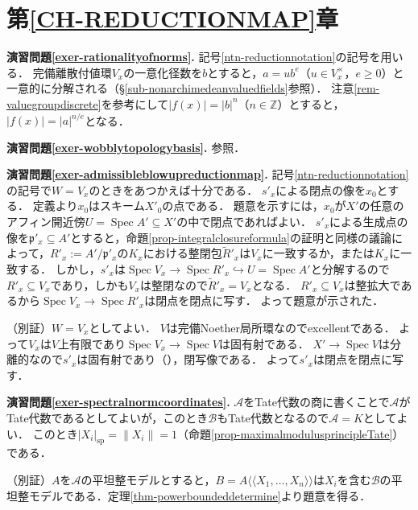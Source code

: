\documentclass[a4paper,12pt, dvipdfmx]{jsbook}
\def\Z{\mathbb{Z}}
\def\til#1{\widetilde{#1}}%
\def\sp{\mathop{\mathrm{sp}}\nolimits}
\def\Spec{\mathop{\mathrm{Spec}}\nolimits}
\def\dl{\langle\!\langle}
\def\dr{\rangle\!\rangle}
\newcommand{\abs}[1]{\lvert#1\rvert}
\newcommand{\abss}[1]{\|#1\|}
\theoremstyle{plain}
\theoremstyle{definition}
\begin{document}
{\section*{第\ref{CH-REDUCTIONMAP}章}

\noindent
{\bf 演習問題\ref{exer-rationalityofnorms}.}
記号\ref{ntn-reductionnotation}の記号を用いる．
完備離散付値環$V_x$の一意化径数を$b$とすると，$a=ub^e$（$u\in V^{\times}_x$，$e\geq 0$）と一意的に分解される（\S\ref{sub-nonarchimedeanvaluedfields}参照）．
注意\ref{rem-valuegroupdiscrete}を参考にして$\abs{f(x)}=\abs{b}^n$（$n\in\Z$）とすると，$\abs{f(x)}=\abs{a}^{n/e}$となる．

\medskip\noindent
{\bf 演習問題\ref{exer-wobblytopologybasis}.}
\cite[\S7.2.1]{BGR}参照．

\medskip\noindent
{\bf 演習問題\ref{exer-admissibleblowupreductionmap}.}
記号\ref{ntn-reductionnotation}の記号で$W=V_x$のときをあつかえば十分である．
$s'_x$による閉点の像を$x_0$とする．
定義より$x_0$はスキーム$X'_0$の点である．
題意を示すには，$x_0$が$X'$の任意のアフィン開近傍$U=\Spec A'\subseteq X'$の中で閉点であればよい．
$s'_x$による生成点の像を$\mathfrak{p}'_x\subseteq A'$とすると，命題\ref{prop-integralclosureformula}の証明と同様の議論によって，$R'_x:=A'/\mathfrak{p}'_x$の$K_x$における整閉包$\til{R}'_x$は$V_x$に一致するか，または$K_x$に一致する．
しかし，$s'_x$は$\Spec V_x\rightarrow\Spec R'_x\hookrightarrow U=\Spec A'$と分解するので$R'_x\subseteq V_x$であり，しかも$V_x$は整閉なので$\til{R}'_x=V_x$となる．
$R'_x\subseteq V_x$は整拡大であるから$\Spec V_x\rightarrow\Spec R'_x$は閉点を閉点に写す．
よって題意が示された．

\medskip\noindent
（別証）$W=V_x$としてよい．
$V$は完備Noether局所環なのでexcellentである．
よって$V_x$は$V$上有限であり$\Spec V_x\rightarrow\Spec V$は固有射である．
$X'\rightarrow\Spec V$は分離的なので$s'_x$は固有射であり（\cite[Chap.\ II, Cor.\ 4.8 (e)]{Hart2}），閉写像である．
よって$s'_x$は閉点を閉点に写す．

\medskip\noindent
{\bf 演習問題\ref{exer-spectralnormcoordinates}.}
$\mathcal{A}$をTate代数の商に書くことで$\mathcal{A}$がTate代数であるとしてよいが，このとき$\mathcal{B}$もTate代数となるので$\mathcal{A}=K$としてよい．
このとき$\abs{X_i}_{\sp}=\abss{X_i}=1$（命題\ref{prop-maximalmodulusprincipleTate}）である．

\medskip\noindent
（別証）$A$を$\mathcal{A}$の平坦整モデルとすると，$B=A\dl X_1,\ldots,X_n\dr$は$X_i$を含む$\mathcal{B}$の平坦整モデルである．定理\ref{thm-powerboundeddetermine}より題意を得る．

}
\end{document}
